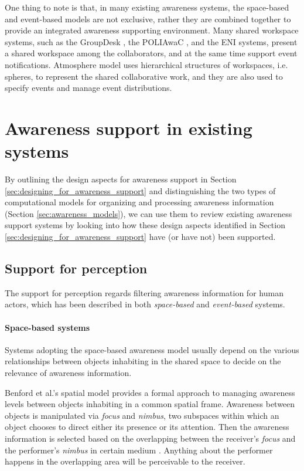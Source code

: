 One thing to note is that, in many existing awareness systems, the space-based and event-based models are not exclusive, rather they are combined together to provide an integrated awareness supporting environment. Many shared workspace systems, such as the GroupDesk \cite{Fuchs1995}, the POLIAwaC \cite{sohlenkamp2000po}, and the ENI \cite{Gross2004} systems, present a shared workspace among the collaborators, and at the same time support event notifications. Atmosphere model \cite{Rittenbruch2002} uses hierarchical structures of workspaces, i.e. spheres, to represent the shared collaborative work, and they are also used to specify events and manage event distributions.

\section{Awareness support in existing systems} %
\label{sec:the_state_of_art}
By outlining the design aspects for awareness support in Section \ref{sec:designing_for_awareness_support} and distinguishing the two types of computational models for organizing and processing awareness information (Section \ref{sec:awareness_models}), we can use them to review existing awareness support systems by looking into how these design aspects identified in Section \ref{sec:designing_for_awareness_support} have (or have not) been supported. 

\subsection{Support for perception} %
\label{sub:support_for_perception}
The support for perception regards filtering awareness information for human actors, which has been described in both \emph{space-based} and \emph{event-based} systems.

\paragraph*{Space-based systems} %
\label{par:space_based_systems}
Systems adopting the space-based awareness model usually depend on the various relationships between objects inhabiting in the shared space to decide on the relevance of awareness information.

Benford et al.'s spatial model \cite{Benford1993} provides a formal approach to managing awareness levels between objects inhabiting in a common spatial frame. Awareness between objects is manipulated via \emph{focus} and \emph{nimbus}, two subspaces within which an object chooses to direct either its presence or its attention. Then the awareness information is selected based on the overlapping between the receiver's \emph{focus} and the performer's \emph{nimbus} in certain medium \cite{Benford1993}. Anything about the performer happens in the overlapping area will be perceivable to the receiver. 

